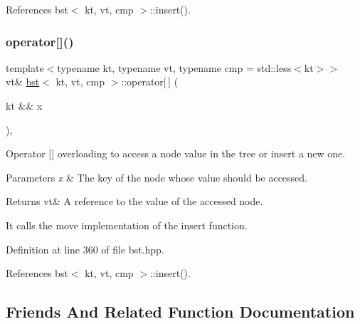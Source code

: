 References bst$<$ kt, vt, cmp $>$\+::insert().

\mbox{\label{classbst_a024d828ac753881e50cd7cc93a47a3cc}} 
\subsubsection{\texorpdfstring{operator[]()}{operator[]()}\hspace{0.1cm}{\footnotesize\ttfamily [2/2]}}
{\footnotesize\ttfamily template$<$typename kt, typename vt, typename cmp = std\+::less$<$kt$>$$>$ \\
vt\& \hyperlink{classbst}{bst}$<$ kt, vt, cmp $>$\+::operator\mbox{[}$\,$\mbox{]} (\begin{DoxyParamCaption}\item[{kt \&\&}]{x }\end{DoxyParamCaption})\hspace{0.3cm}{\ttfamily [inline]}, {\ttfamily [noexcept]}}



Operator \mbox{[}\mbox{]} overloading to access a node value in the tree or insert a new one. 


\begin{DoxyParams}{Parameters}
{\em x} & The key of the node whose value should be accessed. \\
\hline
\end{DoxyParams}
\begin{DoxyReturn}{Returns}
vt\& A reference to the value of the accessed node.
\end{DoxyReturn}
It calls the move implementation of the insert function. 

Definition at line 360 of file bst.\+hpp.



References bst$<$ kt, vt, cmp $>$\+::insert().



\subsection{Friends And Related Function Documentation}
\mbox{\label{classbst_ae4b7d69364fca0855f74abdcad674ebf}} 

